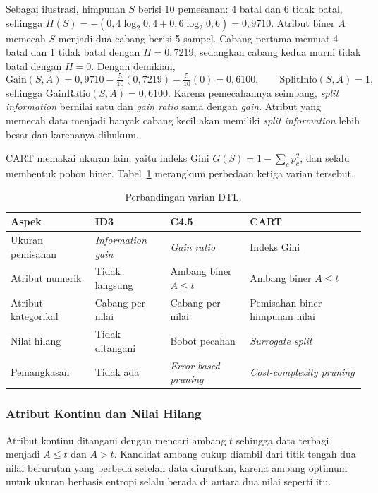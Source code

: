 \begin{contoh}
Sebagai ilustrasi, himpunan $S$ berisi 10 pemesanan: 4 batal dan 6 tidak batal, sehingga $H(S)=-(0{,}4\log_2 0{,}4+0{,}6\log_2 0{,}6)=0{,}9710$. Atribut biner $A$ memecah $S$ menjadi dua cabang berisi 5 sampel. Cabang pertama memuat 4 batal dan 1 tidak batal dengan $H=0{,}7219$, sedangkan cabang kedua murni tidak batal dengan $H=0$. Dengan demikian,
\[
\mathrm{Gain}(S,A)=0{,}9710-\tfrac{5}{10}(0{,}7219)-\tfrac{5}{10}(0)=0{,}6100,\qquad \mathrm{SplitInfo}(S,A)=1,
\]
sehingga $\mathrm{GainRatio}(S,A)=0{,}6100$. Karena pemecahannya seimbang, \textit{split information} bernilai satu dan \textit{gain ratio} sama dengan \textit{gain}. Atribut yang memecah data menjadi banyak cabang kecil akan memiliki \textit{split information} lebih besar dan karenanya dihukum.
\end{contoh}

CART memakai ukuran lain, yaitu indeks Gini $G(S)=1-\sum_c p_c^2$, dan selalu membentuk pohon biner. Tabel~\ref{tab:varian-dtl} merangkum perbedaan ketiga varian tersebut.

\begin{table}[htbp]
    \centering
    \small
    \renewcommand{\arraystretch}{1.15}
    \begin{tabularx}{\textwidth}{@{}lXXX@{}}
        \toprule
        Aspek & ID3 & C4.5 & CART \\
        \midrule
        Ukuran pemisahan & \textit{Information gain} & \textit{Gain ratio} & Indeks Gini \\
        Atribut numerik & Tidak langsung & Ambang biner $A\leq t$ & Ambang biner $A\leq t$ \\
        Atribut kategorikal & Cabang per nilai & Cabang per nilai & Pemisahan biner himpunan nilai \\
        Nilai hilang & Tidak ditangani & Bobot pecahan & \textit{Surrogate split} \\
        Pemangkasan & Tidak ada & \textit{Error-based pruning} & \textit{Cost-complexity pruning} \\
        \bottomrule
    \end{tabularx}
    \caption{Perbandingan varian DTL.}
    \label{tab:varian-dtl}
\end{table}

\subsubsection{Atribut Kontinu dan Nilai Hilang}
Atribut kontinu ditangani dengan mencari ambang $t$ sehingga data terbagi menjadi $A\leq t$ dan $A>t$. Kandidat ambang cukup diambil dari titik tengah dua nilai berurutan yang berbeda setelah data diurutkan, karena ambang optimum untuk ukuran berbasis entropi selalu berada di antara dua nilai seperti itu.

